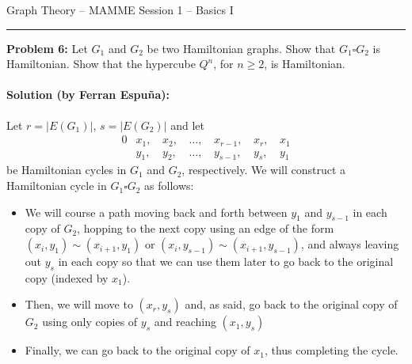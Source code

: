 \documentclass{amsart}
\theoremstyle{plain}
\theoremstyle{definition}
\begin{document}
    {\Large Graph Theory -- MAMME}
    {\Large Session 1 -- Basics I}

    \vspace{0.5cm}

    \hrule

    \vspace{0.5cm}

    \noindent \textbf{Problem 6:}
    Let $G_1$ and $G_2$ be two Hamiltonian graphs.
    Show that $G_1 \square G_2$ is Hamiltonian.
    Show that the hypercube $Q^n$, for $n \geq 2$, is Hamiltonian.


    \paragraph{\textbf{Solution (by Ferran Espuña):}}
    Let $r = \lvert E(G_1)\rvert$, $s = \lvert E(G_2)\rvert$ and let
    \begin{alignat*}{0}
    & x_1, \, & x_2, \, & \ldots, \, & x_{r-1}, \, & x_r, \, & x_1 \\
    & y_1, \, & y_2, \, & \ldots, \, & y_{s-1}, \, & y_s, \, & y_1
    \end{alignat*}
    be Hamiltonian cycles in $G_1$ and $G_2$, respectively.
    We will construct a Hamiltonian cycle in $G_1 \square G_2$ as follows:

    \begin{itemize}
        \item We will course a path moving back and forth between $y_1$ and $y_{s-1}$ in each copy of $G_2$,
    hopping to the next copy using an edge of the form $(x_i, y_1) \sim (x_{i+1}, y_{1})$ or
    $(x_i, y_{s-1}) \sim (x_{i+1}, y_{s-1})$,
    and always leaving out $y_s$ in each copy so that we can use them later to go back to the original copy (indexed by $x_1$).
        \item Then, we will move to $(x_r, y_s)$ and, as said, go back to the original copy of $G_2$ using only copies of $y_s$ and reaching $(x_1, y_s)$
        \item Finally, we can go back to the original copy of $x_1$, thus completing the cycle.
    \end{itemize}
\end{document}
